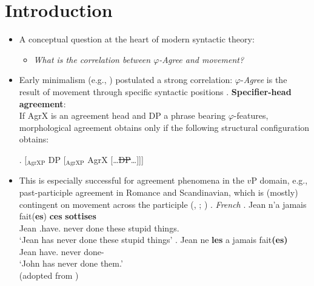 \documentclass[11pt, letterpaper]{paper_nick}
\begin{document}


\section{Introduction}
\begin{itemize}
\item A conceptual question at the heart of modern syntactic theory:
\begin{itemize}
\item \emph{What is the correlation between $\varphi$-\emph{Agree} and movement?}
\end{itemize}
\item Early minimalism (e.g., \citealt{chomsky95}) postulated a strong correlation: $\varphi$-\emph{Agree} is the result of movement through specific syntactic positions 
\ex. {\bf Specifier-head agreement}:\\
If AgrX is an agreement head and DP a phrase bearing $\varphi$-features, morphological agreement obtains only if the following structural configuration obtains: 

\ex. [$_\text{AgrXP}$ DP [$_\text{AgrXP}$ AgrX [\ldots \st{DP}\ldots]]]

\item This is especially successful for agreement phenomena in the $v$P domain, e.g., past-participle agreement in Romance and Scandinavian, which is (mostly) contingent on movement across the participle (\citealt{kayne85}, \citeyear{kayne89b}; \citealt{christensen89})
\ex.\label{ftppa} \emph{French}
\ag. Jean n'a jamais fait({\bf *es}) {\bf ces} {\bf sottises}\\
Jean .have. never done these {stupid things}.\\
`Jean has never done these stupid things'
\bg. Jean ne {\bf les} a jamais fait{\bf (es)}\\
Jean   have. never done-\\
`John has never done them.'\\
(adopted from \citealt{belletti06})


\end{itemize}
\end{document}
